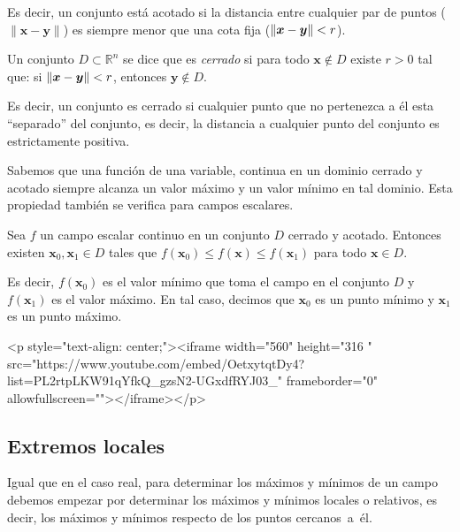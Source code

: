 Es decir, un conjunto está acotado si la distancia entre cualquier par de puntos ($\|\boldsymbol{x}-\boldsymbol{y}\|$) es siempre menor que una cota fija ($\|\boldsymbol{x}-\boldsymbol{y}\|< r$).

\begin{definicion}
Un conjunto $\mathit{D}\subset \mathbb{R}^n$ se dice que es \emph{cerrado}
si para todo $\boldsymbol x\not\in D$ existe $r>0$ tal que:
si $\|\boldsymbol{x}-\boldsymbol{y}\|< r$, entonces $\boldsymbol y\not\in D$.
\end{definicion}

Es decir, un conjunto es cerrado si cualquier punto que no pertenezca a él esta ``separado'' del conjunto, es decir, la distancia a cualquier punto del conjunto es estrictamente positiva.

Sabemos que una función de una variable, continua en un dominio cerrado y acotado siempre alcanza un valor máximo y un valor mínimo en tal dominio.
Esta propiedad también se verifica para campos escalares.
%
\begin{teorema} Sea $f$ un campo escalar continuo en un conjunto $\mathit{D}$ cerrado y acotado.
Entonces existen $\boldsymbol{x}_0,\boldsymbol{x}_1\in\mathit{D}$ tales que $f(\boldsymbol{x}_0)\leq f(\boldsymbol x)\leq f(\boldsymbol{x}_1)$ para todo $\boldsymbol{x}\in\mathit{D}$.
\end{teorema}
%
Es decir, $f(\boldsymbol{x}_0)$ es el valor mínimo que toma el campo en el conjunto $\mathit{D}$ y $f(\boldsymbol{x}_1)$ es el valor máximo. En tal caso, decimos que $\boldsymbol{x}_0$ es un punto mínimo y $\boldsymbol{x}_1$ es un punto máximo.

\begin{rawhtml}
<p style="text-align: center;"><iframe width="560" height="316  " src="https://www.youtube.com/embed/OetxytqtDy4?list=PL2rtpLKW91qYfkQ_gzsN2-UGxdfRYJ03_" frameborder="0" allowfullscreen=""></iframe></p>
\end{rawhtml}

\subsection{Extremos locales}

Igual que en el caso real, para determinar los máximos y mínimos de un campo debemos empezar por determinar los máximos y mínimos locales o relativos, es decir, los máximos y mínimos respecto de los puntos cercanos~a~él.

